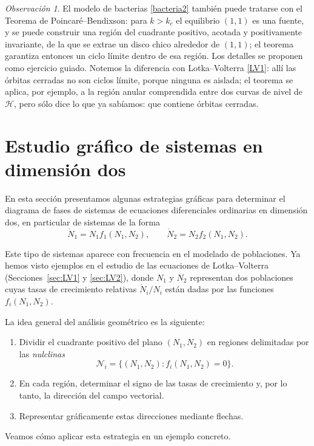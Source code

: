 \documentclass[12pt, a4paper]{amsbook}
\newcommand{\Hc}{{\mathcal H}}
\theoremstyle{remark}
\newtheorem{obs}[teo]{Observación}
\theoremstyle{definition}
\numberwithin{section}{chapter}
\numberwithin{subsection}{section}
\numberwithin{equation}{section}
\numberwithin{figure}{chapter}
\begin{document}
\begin{obs}
El modelo de bacterias \eqref{bacteria2} también puede tratarse con el Teorema de Poincaré--Bendixson: para $k>k_c$ el equilibrio $(1,1)$ es una fuente, y se puede construir una región del cuadrante positivo, acotada y positivamente invariante, de la que se extrae un disco chico alrededor de $(1,1)$; el teorema garantiza entonces un ciclo límite dentro de esa región. Los detalles se proponen como ejercicio guiado. Notemos la diferencia con Lotka--Volterra \eqref{LV1}: allí las órbitas cerradas no son ciclos límite, porque ninguna es aislada; el teorema se aplica, por ejemplo, a la región anular comprendida entre dos curvas de nivel de $\Hc$, pero sólo dice lo que ya sabíamos: que contiene órbitas cerradas.
\end{obs}

\section{Estudio gráfico de sistemas en dimensión dos}

En esta sección presentamos algunas estrategias gráficas para determinar el diagrama de fases de sistemas de ecuaciones diferenciales ordinarias en dimensión dos, en particular de sistemas de la forma
\[
\dot N_1 = N_1 f_1(N_1,N_2), \qquad \dot N_2 = N_2 f_2(N_1,N_2).
\]

Este tipo de sistemas aparece con frecuencia en el modelado de poblaciones. Ya hemos visto ejemplos en el estudio de las ecuaciones de Lotka--Volterra (Secciones~\ref{sec:LV1} y \ref{sec:LV2}), donde $N_1$ y $N_2$ representan dos poblaciones cuyas tasas de crecimiento relativas $\dot N_i/N_i$ están dadas por las funciones $f_i(N_1,N_2)$.

La idea general del análisis geométrico es la siguiente:
\begin{enumerate}
\item Dividir el cuadrante positivo del plano $(N_1,N_2)$ en regiones delimitadas por las {\em nulclinas}
\[
\mathcal N_i=\{(N_1,N_2)\colon f_i(N_1,N_2)=0\}.
\]
\item En cada región, determinar el signo de las tasas de crecimiento y, por lo tanto, la dirección del campo vectorial.
\item Representar gráficamente estas direcciones mediante flechas.
\end{enumerate}

Veamos cómo aplicar esta estrategia en un ejemplo concreto.
\end{document}
